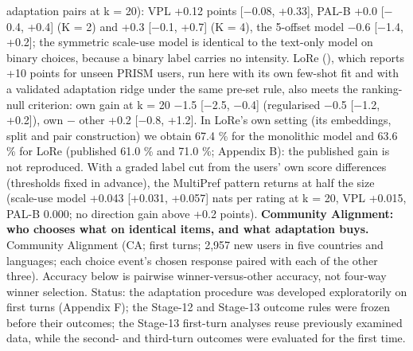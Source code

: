 \documentclass{article}
\begin{document}
adaptation pairs at k = 20): VPL +0.12 points {[}$-$0.08, +0.33{]}, PAL-B +0.0 {[}$-$0.4, +0.4{]} (K = 2) and +0.3 {[}$-$0.1, +0.7{]} (K = 4), the 5-offset model $-$0.6 {[}$-$1.4, +0.2{]}; the symmetric scale-use model is identical to the text-only model on binary choices, because a binary label carries no intensity. LoRe (\citealp{bose2025lore}), which reports +10 points for unseen PRISM users, run here with its own few-shot fit and with a validated adaptation ridge under the same pre-set rule, also meets the ranking-null criterion: own gain at k = 20 $-$1.5 {[}$-$2.5, $-$0.4{]} (regularised $-$0.5 {[}$-$1.2, +0.2{]}), own $-$ other +0.2 {[}$-$0.8, +1.2{]}. In LoRe's own setting (its embeddings, split and pair construction) we obtain 67.4 \% for the monolithic model and 63.6 \% for LoRe (published 61.0 \% and 71.0 \%; Appendix B): the published gain is not reproduced. With a graded label cut from the users' own score differences (thresholds fixed in advance), the MultiPref pattern returns at half the size (scale-use model +0.043 {[}+0.031, +0.057{]} nats per rating at k = 20, VPL +0.015, PAL-B 0.000; no direction gain above +0.2 points). \textbf{Community Alignment: who chooses what on identical items, and what adaptation buys.} Community Alignment (CA; first turns; 2,957 new users in five countries and languages; each choice event's chosen response paired with each of the other three). Accuracy below is pairwise winner-versus-other accuracy, not four-way winner selection. Status: the adaptation procedure was developed exploratorily on first turns (Appendix F); the Stage-12 and Stage-13 outcome rules were frozen before their outcomes; the Stage-13 first-turn analyses reuse previously examined data, while the second- and third-turn outcomes were evaluated for the first time.
\end{document}
